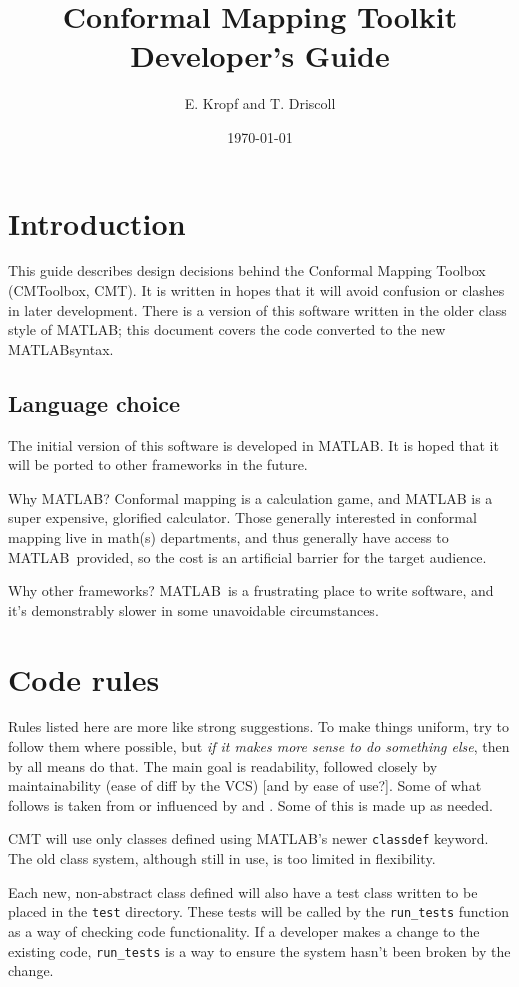 \documentclass[12pt]{article}
\title{Conformal Mapping Toolkit Developer's Guide}
\author{E. Kropf and T. Driscoll}
\date{\today}
\newcommand{\matlab}{MATLAB}
\begin{document}
\maketitle
\tableofcontents
\clearpage

\section{Introduction}
This guide describes design decisions behind the Conformal Mapping Toolbox (CMToolbox, CMT). It is written in hopes that it will avoid confusion or clashes in later development. There is a version of this software written in the older class style of \matlab; this document covers the code converted to the new \matlab syntax.

\subsection{Language choice}
The initial version of this software is developed in \matlab. It is hoped that it will be ported to other frameworks in the future.

Why \matlab? Conformal mapping is a calculation game, and MATLAB is a super expensive, glorified calculator. Those generally interested in conformal mapping live in math(s) departments, and thus generally have access to \matlab\ provided, so the cost is an artificial barrier for the target audience.

Why other frameworks? \matlab\ is a frustrating place to write software, and it's demonstrably slower in some unavoidable circumstances.

\section{Code rules}
Rules listed here are more like strong suggestions. To make things uniform, try to follow them where possible, but \emph{if it makes more sense to do something else}, then by all means do that. The main goal is readability, followed closely by maintainability (ease of diff by the VCS) [and by ease of use?]. Some of what follows is taken from or influenced by \cite{chebfunCodingStyle} and \cite{pythonStyleGuide}. Some of this is made up as needed.

CMT will use only classes defined using \matlab's newer \verb+classdef+ keyword. The old class system, although still in use, is too limited in flexibility.

Each new, non-abstract class defined will also have a test class written to be placed in the \verb+test+ directory. These tests will be called by the \verb+run_tests+ function as a way of checking code functionality. If a developer makes a change to the existing code, \verb+run_tests+ is a way to ensure the system hasn't been broken by the change.
\end{document}
